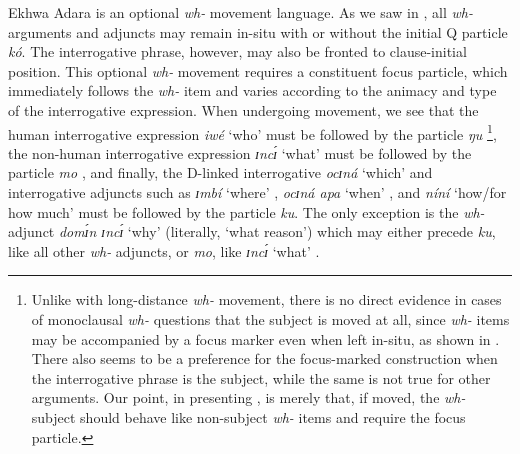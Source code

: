\documentclass[output=paper,colorlinks,citecolor=brown
]{langscibook}
\begin{document}
Ekhwa Adara is an optional \textit{wh-} movement language. As we saw in , all \textit{wh-} arguments and adjuncts may remain in-situ with or without the initial Q particle \textit{kó}. 
The interrogative phrase, however, may also be fronted to clause-initial position. This optional \textit{wh-} movement requires a constituent focus particle, which immediately follows the \textit{wh-} item and varies according to the animacy and type of the interrogative expression. When undergoing movement, we see that the human interrogative expression \textit{iwé} `who' must be followed by the particle \textit{ŋu} \footnote{Unlike with long-distance \textit{wh-} movement, there is no direct evidence in cases of monoclausal \textit{wh-} questions that the subject is moved at all, since \textit{wh-} items may be accompanied by a focus marker even when left in-situ, as shown in . There also seems to be a preference for the focus-marked construction when the interrogative phrase is the subject, while the same is not true for other arguments. Our point, in presenting , is merely that, if moved, the \textit{wh-} subject should behave like non-subject \textit{wh-} items and require the focus particle.}, the non-human interrogative expression \textit{ɪncɪ́} `what' must be followed by the particle \textit{mo} , and finally, the D-linked interrogative \textit{ocɪná}  `which' and interrogative adjuncts such as \textit{ɪmbí} `where' , \textit{ocɪná apa} `when' , and \textit{níní} `how/for how much'  must be followed by the particle \textit{ku}. The only exception is the \textit{wh-} adjunct \textit{domɪ́n ɪncɪ́} `why' (literally, `what reason') which may either precede \textit{ku}, like all other \textit{wh-} adjuncts, or \textit{mo}, like \textit{ɪncɪ́} `what' .
\end{document}
